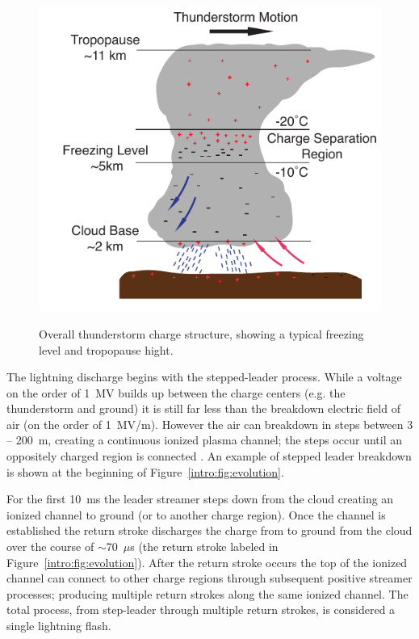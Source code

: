 \begin{figure}[ht!]
	\centering
	\includegraphics[scale=1]{Introduction/Figures/thunderstorm_structure.pdf}\\
	\caption{Overall thunderstorm charge structure, showing a typical freezing level and tropopause hight.}
	\label{intro:fig:thunderstorm}
\end{figure}

The lightning discharge begins with the stepped-leader process.
While a voltage on the order of 1~MV builds up between the charge centers (e.g. the thunderstorm and ground) it is still far less than the breakdown electric field of air (on the order of 1~MV/m).
However the air can breakdown in steps between 3 -- 200~m, creating a continuous ionized plasma channel; the steps occur until an oppositely charged region is connected \citep{Ogawa1995}.
An example of stepped leader breakdown is shown at the beginning of Figure~\ref{intro:fig:evolution}.

For the first 10~ms the leader streamer steps down from the cloud creating an ionized channel to ground (or to another charge region).
Once the channel is established the return stroke discharges the charge from to ground from the cloud over the course of $\sim$70~$\mu$s (the return stroke labeled in Figure~\ref{intro:fig:evolution}).
After the return stroke occurs the top of the ionized channel can connect to other charge regions through subsequent positive streamer processes; producing multiple return strokes along the same ionized channel.
The total process, from step-leader through multiple return strokes, is considered a single lightning flash.

